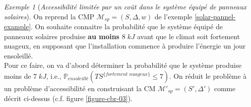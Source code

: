 \documentclass[12pt,a4paper]{report}
\theoremstyle{definition}%
\theoremstyle{remark}
\newtheorem{example}{Exemple}[chapter]
\newcommand{\ie}{i.e., }
\newcommand{\cf}{c.f. }
\newcommand{\pr}{\mathbb{P}}
\begin{document}
\begin{example}[\textit{Accessibilité limitée par un coût dans le système équipé de panneaux solaires}]
	On reprend la CMP $\mathcal{M}_{sp} = (S, \Delta, w)$ de l'exemple \ref{solar-pannel-example}.
	On souhaite connaitre la probabilité que le système équipé de panneaux solaires produise \textbf{au moins $8 \; kJ$} avant que le climat soit fortement nuageux, en supposant que l'installation commence à produire l'énergie un jour ensoleillé.\\
	Pour ce faire, on va d'abord déterminer la probabilité que le système produise moins de $7\; kJ$, \ie $\pr_{\textit{ensoleillé}}(TS^{\{ \textit{fortement nuageux} \}} \leq 7)$. On réduit le problème à un problème d'accessibilité en construisant la CM $\mathcal{M'}_{sp} = (S', \Delta')$ comme décrit ci-dessus (\cf figure \ref{figure-cbr-03}).


\end{example}
\end{document}
